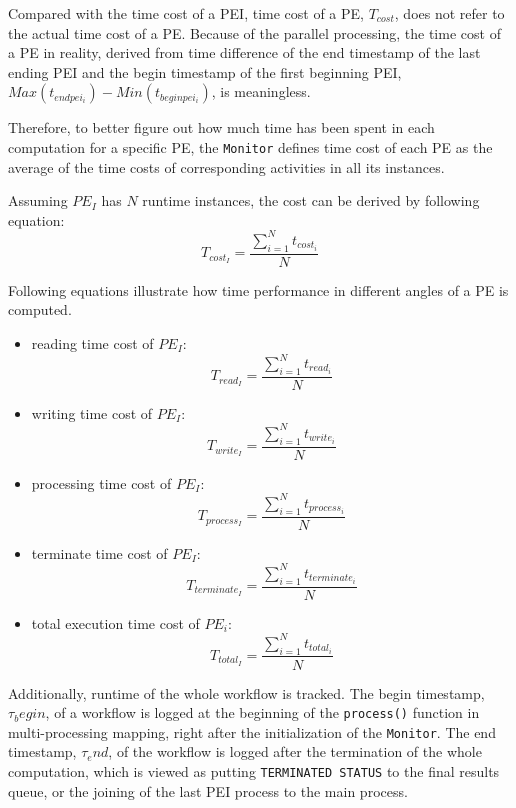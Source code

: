 \documentclass[10pt,twoside,openright,logo]{report}
\begin{document}
Compared with the time cost of a PEI, time cost of a PE, $T_{cost}$, does not refer to the actual time cost of a PE. Because of the parallel processing, the time cost of a PE in reality, derived from time difference of the end timestamp of the last ending PEI and the begin timestamp of the first beginning PEI, $Max(t_{endpei_i}) - Min(t_{beginpei_i})$, is meaningless.

Therefore, to better figure out how much time has been spent in each computation for a specific PE, the \texttt{Monitor} defines time cost of each PE as the average of the time costs of corresponding activities in all its instances.

Assuming $PE_I$ has $N$ runtime instances, the cost can be derived by following equation:
$$T_{cost_I} = \frac{\sum\limits^{N}_{i=1}t_{cost_i}}{N}$$

Following equations illustrate how time performance in different angles of a PE is computed.
\begin{itemize}
    \item reading time cost of $PE_I$:
            $$T_{read_I} = \frac{\sum\limits^{N}_{i=1}t_{read_i}}{N}$$
    \item writing time cost of $PE_I$:
            $$T_{write_I} = \frac{\sum\limits^{N}_{i=1}t_{write_i}}{N}$$
    \item processing time cost of $PE_I$:
            $$T_{process_I} = \frac{\sum\limits^{N}_{i=1}t_{process_i}}{N}$$
    \item terminate time cost of $PE_I$:
            $$T_{terminate_I} = \frac{\sum\limits^{N}_{i=1}t_{terminate_i}}{N}$$
    \item total execution time cost of $PE_i$:
            $$T_{total_I} = \frac{\sum\limits^{N}_{i=1}t_{total_i}}{N}$$

\end{itemize}

Additionally, runtime of the whole workflow is tracked. The begin timestamp, $\tau_begin$, of a workflow is logged at the beginning of the \texttt{process()} function in multi-processing mapping, right after the initialization of the \texttt{Monitor}. The end timestamp, $\tau_end$, of the workflow is logged after the termination of the whole computation, which is viewed as putting \texttt{TERMINATED STATUS} to the final results queue, or the joining of the last PEI process to the main process.
\end{document}
